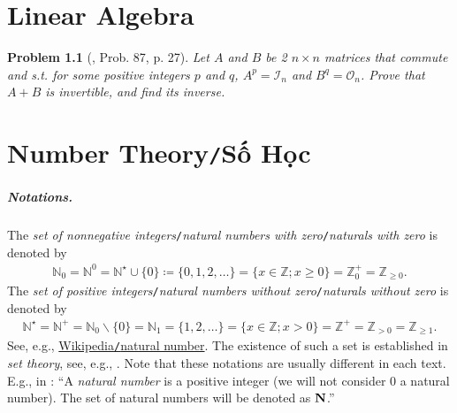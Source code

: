 \documentclass[oneside]{book}
\numberwithin{equation}{section}
\newtheorem{problem}{Problem}[section]
\begin{document}
\chapter{Linear Algebra}

\begin{problem}[\cite{Gelca_Andreescu2017}, Prob. 87, p. 27]
	Let $A$ and $B$ be 2 $n\times n$ matrices that commute and s.t. for some positive integers $p$ and $q$, $A^p = \mathcal{I}_n$ and $B^q = \mathcal{O}_n$. Prove that $A + B$ is invertible, and find its inverse.
\end{problem}


\chapter{Number Theory\texttt{/}Số Học}

\paragraph{Notations.} The \textit{set of nonnegative integers}\texttt{/}\textit{natural numbers with zero}\texttt{/}\textit{naturals with zero} is denoted by
\begin{align*}
	\mathbb{N}_0 = \mathbb{N}^0 = \mathbb{N}^\star\cup\{0\}\coloneqq\{0,1,2,\ldots\} = \{x\in\mathbb{Z};x\ge 0\} = \mathbb{Z}_0^+ = \mathbb{Z}_{\ge 0}.
\end{align*}
The \textit{set of positive integers}\texttt{/}\textit{natural numbers without zero}\texttt{/}\textit{naturals without zero} is denoted by
\begin{align*}
	\mathbb{N}^\star = \mathbb{N}^+ = \mathbb{N}_0\backslash\{0\} = \mathbb{N}_1 = \{1,2,\ldots\} = \{x\in\mathbb{Z};x > 0\} = \mathbb{Z}^+ = \mathbb{Z}_{> 0} = \mathbb{Z}_{\ge 1}.
\end{align*}
See, e.g., \href{https://en.wikipedia.org/wiki/Natural_number}{Wikipedia\texttt{/}natural number}. The existence of such a set is established in \textit{set theory}, see, e.g., \cite{Halmos1960, Halmos1974, Kaplansky1972, Kaplansky1977}. Note that these notations are usually different in each text. E.g., in \cite[Chap. 2, p. 10]{Tao2006}: ``A \textit{natural number} is a positive integer (we will not consider 0 a natural number). The set of natural numbers will be denoted as ${\bf N}$.''
\end{document}
